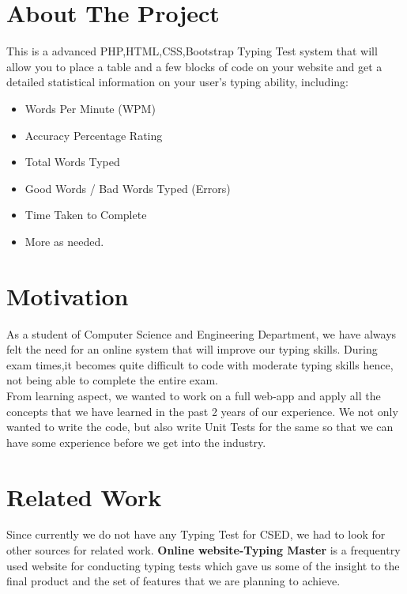 \documentclass{mnnit}
\begin{document}
\section{About The Project}
This is a advanced PHP,HTML,CSS,Bootstrap Typing Test system that will allow you to place a table and a few blocks of code on your website and get a detailed statistical information on your user's typing ability, including:
\begin{itemize}
    \item Words Per Minute (WPM)
    \item Accuracy Percentage Rating
    \item Total Words Typed
    \item Good Words / Bad Words Typed (Errors)
    \item Time Taken to Complete
    \item More as needed.
\end{itemize}

\section{Motivation}
As a student of Computer Science and Engineering Department, we have always felt the need for an online system that will improve our typing skills. During exam times,it becomes quite difficult to code with moderate typing skills hence, not being able to complete the entire exam.\\
From learning aspect, we wanted to work on a full web-app and apply all the concepts that we have learned in the past 2 years of our experience. We not only wanted to write the code, but also write Unit Tests for the same so that we can have some experience before we get into the industry.

\section{Related Work}
Since currently we do not have any Typing Test for CSED, we had to look for other sources for related work. \textbf{Online website-Typing Master}\cite{Refworks=1} is a frequentry used website for conducting typing tests which gave us some of the insight to the final product and the set of features that we are planning to achieve.
\end{document}
